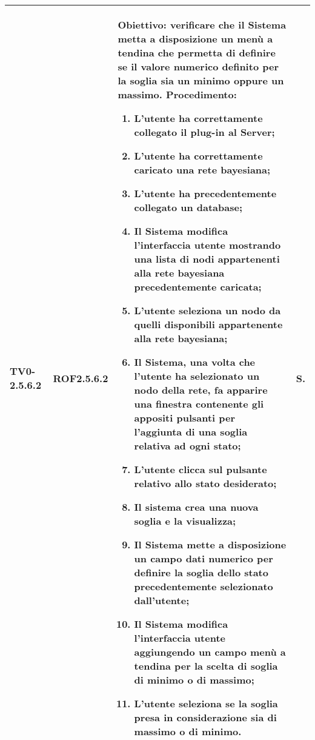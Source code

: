 \begin{longtable}{|C{.15\textwidth}|C{.13\textwidth}|m{.65\textwidth}|C{.08\textwidth}|}
TV0-2.5.6.2 & ROF2.5.6.2 &
	\textbf{Obiettivo}: verificare che il Sistema metta a disposizione un menù a tendina che permetta di definire se il valore numerico definito per la soglia sia un minimo oppure un massimo. \newline
	\textbf{Procedimento}:
	\begin{enumerate}
		\setlength\itemsep{0pt}
		\item L'utente ha correttamente collegato il plug-in al Server;
		\item L'utente ha correttamente caricato una rete bayesiana;
		\item L'utente ha precedentemente collegato un database;
		\item Il Sistema modifica l'interfaccia utente mostrando una lista di nodi appartenenti alla rete bayesiana precedentemente caricata;
		\item L'utente seleziona un nodo da quelli disponibili appartenente alla rete bayesiana;
		\item Il Sistema, una volta che l'utente ha selezionato un nodo della rete, fa apparire una finestra contenente gli appositi pulsanti per l'aggiunta di una soglia relativa ad ogni stato;
		\item L'utente clicca sul pulsante relativo allo stato desiderato;
		\item Il sistema crea una nuova soglia e la visualizza;
		\item Il Sistema mette a disposizione un campo dati numerico per definire la soglia dello stato precedentemente selezionato dall'utente;
		\item Il Sistema modifica l'interfaccia utente aggiungendo un campo menù a tendina per la scelta di soglia di minimo o di massimo;
		\item L'utente seleziona se la soglia presa in considerazione sia di massimo o di minimo.
	\end{enumerate}
	& S. \\
\hline


\end{longtable}
